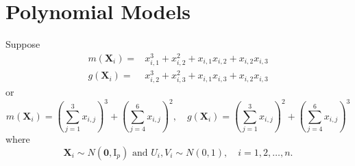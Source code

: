 \documentclass[en,12pt,mtpro2]{elegantpaper}
\begin{document}
\section{Polynomial Models}

Suppose
\begin{equation}
    \begin{aligned}
        m(\mathbf{X}_{i})= & x_{i,1}^{3}+x_{i,2}^{2}+x_{i,1}x_{i,2}+x_{i,2}x_{i,3} \\
        g(\mathbf{X}_{i})= & x_{i,2}^{3}+x_{i,3}^{2}+x_{i,1}x_{i,3}+x_{i,2}x_{i,3}
    \end{aligned}
    \label{eq:polynomial-model-1}
\end{equation}
or
\begin{equation}
    m(\mathbf{X}_{i})=\left(\sum_{j=1}^{3}x_{i,j}\right)^{3}+\left(\sum_{j=4}^{6}x_{i,j}\right)^{2},\quad g(\mathbf{X}_{i})=\left(\sum_{j=1}^{3}x_{i,j}\right)^{2}+\left(\sum_{j=4}^{6}x_{i,j}\right)^{3}
    \label{eq:polynomial-model-2}
\end{equation}
where
\begin{equation*}
    \mathbf{X}_{i}\sim N\left(\boldsymbol{0},\mathrm{I}_{p}\right)\text{ and }U_{i},V_{i}\sim N\left(0,1\right),\quad i=1,2,\ldots,n.
\end{equation*}
\end{document}
